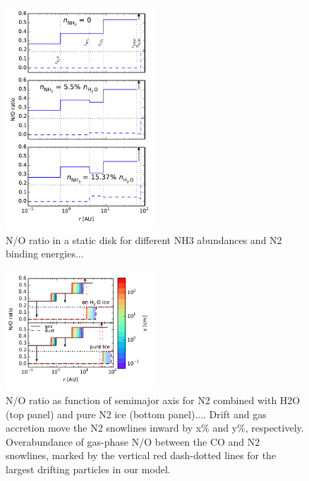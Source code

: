 \documentclass[apj]{emulateapj}
\begin{document}
\begin{figure}[h!]
\centering
\includegraphics[width=0.5\textwidth]{../../figs/N_O_ratio.pdf}
\caption{N/O ratio in a static disk for different NH3 abundances and N2 binding energies...} 
\label{fig:Nstatic}
\end{figure}


\begin{figure}[h!]
\centering
\includegraphics[width=0.5\textwidth]{../../figs/N_O_water_ice.pdf}
\caption{N/O ratio as function of semimajor axis for N2 combined with H2O (top panel) and pure N2 ice (bottom panel).... Drift and gas accretion move the N2 snowlines inward by x\% and y\%, respectively. Overabundance of gas-phase N/O between the CO and N2 snowlines, marked by the vertical red dash-dotted lines for the largest drifting particles in our model.} 
\label{fig:NO_ratio}
\end{figure}
\end{document}
